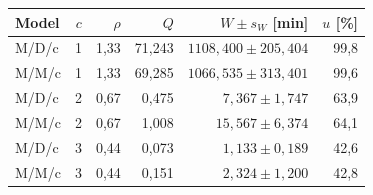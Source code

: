 \begin{tabular}{lrrrrr}
\toprule
Model & $c$ & $\rho$ & $Q$ & $W\pm s_W$ [min] & $u$ [\%] \\
\midrule
M/D/c & 1 & 1,33 & 71,243 & \(1108,400 \pm 205,404\) & 99,8 \\
M/M/c & 1 & 1,33 & 69,285 & \(1066,535 \pm 313,401\) & 99,6 \\
M/D/c & 2 & 0,67 & 0,475 & \(7,367 \pm 1,747\) & 63,9 \\
M/M/c & 2 & 0,67 & 1,008 & \(15,567 \pm 6,374\) & 64,1 \\
M/D/c & 3 & 0,44 & 0,073 & \(1,133 \pm 0,189\) & 42,6 \\
M/M/c & 3 & 0,44 & 0,151 & \(2,324 \pm 1,200\) & 42,8 \\
\bottomrule
\end{tabular}

